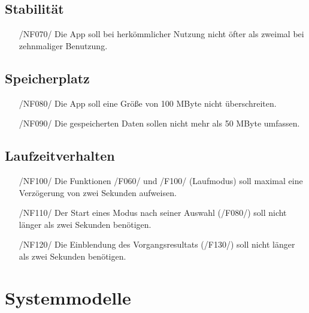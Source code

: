 \documentclass[a4paper,12pt]{article}
\begin{document}
\subsection{Stabilität}
\begin{itemize}
  \item[/NF070/] Die App soll bei herkömmlicher Nutzung nicht öfter als zweimal bei zehnmaliger Benutzung. %
\end{itemize}
\subsection{Speicherplatz}
\begin{itemize}
  \item[/NF080/] Die App soll eine Größe von 100 MByte nicht überschreiten. %
  \item[/NF090/] Die gespeicherten Daten sollen nicht mehr als 50 MByte umfassen. %
\end{itemize}
\subsection{Laufzeitverhalten}
\begin{itemize}
  \item[/NF100/] Die Funktionen /F060/ und /F100/ (Laufmodus) soll maximal eine Verzögerung von zwei Sekunden aufweisen. %
  \item[/NF110/] Der Start eines Modus nach seiner Auswahl (/F080/) soll nicht länger als zwei Sekunden benötigen. %
  \item[/NF120/] Die Einblendung des Vorgangsresultats (/F130/) soll nicht länger als zwei Sekunden benötigen.%

\end{itemize}
\section{Systemmodelle}
\end{document}

